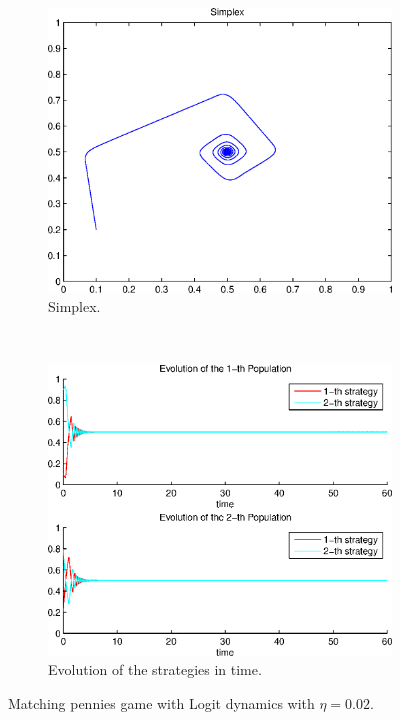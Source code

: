 \documentclass[a4paper,10pt]{article}
\begin{document}
\begin{figure}[h]
  \centering
  \begin{subfigure}[b]{0.45\textwidth}
	  \includegraphics[width=\textwidth]{./images/test2_simplex_logit.eps}
	  \caption{Simplex.}
	  \label{fig:test2_simplex_logit}
  \end{subfigure}
  ~ 
  \begin{subfigure}[b]{0.45\textwidth}
	  \includegraphics[width=\textwidth]{./images/test2_ev_logit.eps}
	  \caption{Evolution of the strategies in time.}
	  \label{fig:test2_ev_logit}
  \end{subfigure}
  \caption{Matching pennies game with Logit dynamics with $\eta=0.02$.}
  \label{fig:mp_game_logit}
\end{figure}
\end{document}

